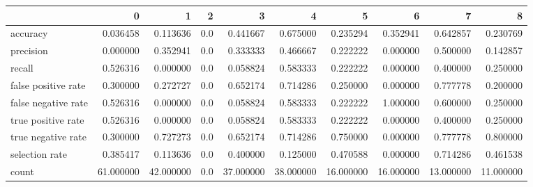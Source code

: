 \begin{tabular}{lrrrrrrrrr}
\toprule
{} &          0 &          1 &    2 &          3 &          4 &          5 &          6 &          7 &          8 \\
\midrule
accuracy            &   0.036458 &   0.113636 &  0.0 &   0.441667 &   0.675000 &   0.235294 &   0.352941 &   0.642857 &   0.230769 \\
precision           &   0.000000 &   0.352941 &  0.0 &   0.333333 &   0.466667 &   0.222222 &   0.000000 &   0.500000 &   0.142857 \\
recall              &   0.526316 &   0.000000 &  0.0 &   0.058824 &   0.583333 &   0.222222 &   0.000000 &   0.400000 &   0.250000 \\
false positive rate &   0.300000 &   0.272727 &  0.0 &   0.652174 &   0.714286 &   0.250000 &   0.000000 &   0.777778 &   0.200000 \\
false negative rate &   0.526316 &   0.000000 &  0.0 &   0.058824 &   0.583333 &   0.222222 &   1.000000 &   0.600000 &   0.250000 \\
true positive rate  &   0.526316 &   0.000000 &  0.0 &   0.058824 &   0.583333 &   0.222222 &   0.000000 &   0.400000 &   0.250000 \\
true negative rate  &   0.300000 &   0.727273 &  0.0 &   0.652174 &   0.714286 &   0.750000 &   0.000000 &   0.777778 &   0.800000 \\
selection rate      &   0.385417 &   0.113636 &  0.0 &   0.400000 &   0.125000 &   0.470588 &   0.000000 &   0.714286 &   0.461538 \\
count               &  61.000000 &  42.000000 &  0.0 &  37.000000 &  38.000000 &  16.000000 &  16.000000 &  13.000000 &  11.000000 \\
\bottomrule
\end{tabular}
